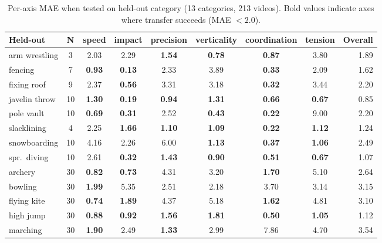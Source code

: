 \documentclass[11pt]{article}
\begin{document}
\begin{table}[t]
\centering
\caption{Per-axis MAE when tested on held-out category (13 categories, 213 videos). Bold values indicate axes where transfer succeeds (MAE $< 2.0$).}
\label{tab:transfer}
\small
\begin{tabular}{lcccccccr}
\toprule
\textbf{Held-out} & \textbf{N} & \textbf{speed} & \textbf{impact} & \textbf{precision} & \textbf{verticality} & \textbf{coordination} & \textbf{tension} & \textbf{Overall} \\
\midrule
arm wrestling & 3 & 2.03 & 2.29 & \textbf{1.54} & \textbf{0.78} & \textbf{0.87} & 3.80 & 1.89 \\
fencing & 7 & \textbf{0.93} & \textbf{0.13} & 2.33 & 3.89 & \textbf{0.33} & 2.09 & 1.62 \\
fixing roof & 9 & 2.37 & \textbf{0.56} & 3.31 & 3.18 & \textbf{0.32} & 3.44 & 2.20 \\
javelin throw & 10 & \textbf{1.30} & \textbf{0.19} & \textbf{0.94} & \textbf{1.31} & \textbf{0.66} & \textbf{0.67} & 0.85 \\
pole vault & 10 & \textbf{0.69} & \textbf{0.31} & 2.52 & \textbf{0.43} & \textbf{0.22} & 9.00 & 2.20 \\
slacklining & 4 & 2.25 & \textbf{1.66} & \textbf{1.10} & \textbf{1.09} & \textbf{0.22} & \textbf{1.12} & 1.24 \\
snowboarding & 10 & 4.16 & 2.26 & 6.00 & \textbf{1.13} & \textbf{0.37} & \textbf{1.06} & 2.49 \\
spr.\ diving & 10 & 2.61 & \textbf{0.32} & \textbf{1.43} & \textbf{0.90} & \textbf{0.51} & \textbf{0.67} & 1.07 \\
archery & 30 & \textbf{0.82} & \textbf{0.73} & 4.31 & 3.20 & \textbf{1.70} & 5.10 & 2.64 \\
bowling & 30 & \textbf{1.99} & 5.35 & 2.51 & 2.18 & 3.70 & 3.14 & 3.15 \\
flying kite & 30 & \textbf{0.74} & \textbf{1.89} & 4.37 & 5.18 & \textbf{1.62} & 4.81 & 3.10 \\
high jump & 30 & \textbf{0.88} & \textbf{0.92} & \textbf{1.56} & \textbf{1.81} & \textbf{0.50} & \textbf{1.05} & 1.12 \\
marching & 30 & \textbf{1.90} & 2.49 & \textbf{1.33} & 2.99 & 7.86 & 4.70 & 3.54 \\
\bottomrule
\end{tabular}
\end{table}
\end{document}
